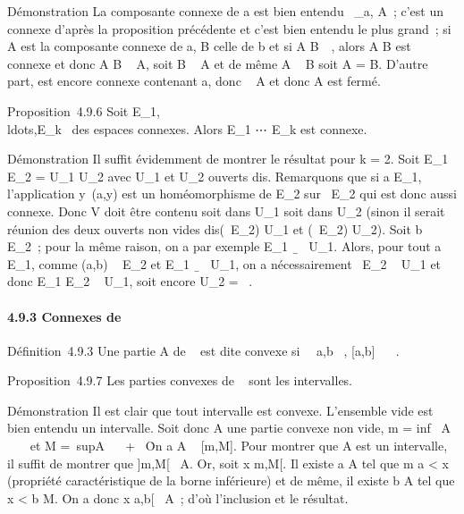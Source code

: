 \documentclass[]{article}
\begin{document}
Démonstration La composante connexe de a est bien entendu
\⋃  ~\_a\inA,
A\textconnexeA~; c'est un connexe d'après la
proposition précédente et c'est bien entendu le plus grand~; si A est la
composante connexe de a, B celle de b et si A \bigcap
B\neq~\varnothing~, alors A \cup B est connexe et donc A \cup B \subset~
A, soit B \subset~ A et de même A \subset~ B soit A = B. D'autre part,
\overlineA est encore connexe contenant a, donc
\overlineA \subset~ A et donc A est fermé.

Proposition~4.9.6 Soit
E\_1,\\ldots,E\_k~
des espaces connexes. Alors E\_1 \times⋯ \times
E\_k est connexe.

Démonstration Il suffit évidemment de montrer le résultat pour k = 2.
Soit E\_1 \times E\_2 = U\_1 \cup U\_2 avec
U\_1 et U\_2 ouverts dis\jmathoints. Remarquons que si a \in
E\_1, l'application y\mapsto~(a,y) est un
homéomorphisme de E\_2 sur \a\
\times E\_2 qui est donc aussi connexe. Donc V doit être contenu soit
dans U\_1 soit dans U\_2 (sinon il serait réunion des
deux ouverts non vides dis\jmathoints (\a\
\times E\_2) \bigcap U\_1 et (\a\
\times E\_2) \bigcap U\_2). Soit b \in E\_2~; pour la même
raison, on a par exemple E\_1
\times\b\ \subset~ U\_1. Alors, pour tout
a \in E\_1, comme (a,b) \in\a\ \times
E\_2 et E\_1 \times\b\ \subset~
U\_1, on a nécessairement \a\
\times E\_2 \subset~ U\_1 et donc E\_1 \times E\_2 \subset~
U\_1, soit encore U\_2 = \varnothing~.

\paragraph{4.9.3 Connexes de ~}

Définition~4.9.3 Une partie A de ~ est dite convexe si
\forall~~a,b \in {}~, {[}a,b{]} \subset~ ~.

Proposition~4.9.7 Les parties convexes de ~ sont les intervalles.

Démonstration Il est clair que tout intervalle est convexe. L'ensemble
vide est bien entendu un intervalle. Soit donc A une partie convexe non
vide, m = inf~ A \in \mathbb{R}~
\cup\-\infty~\ et M =\
supA \in {}~ \cup\ + \infty~\. On a A \subset~
{[}m,M{]}. Pour montrer que A est un intervalle, il suffit de montrer
que {]}m,M{[}\subset~ A. Or, soit x \in{]}m,M{[}. Il existe a \in A tel que m \leq a
\textless{} x (propriété caractéristique de la borne inférieure) et de
même, il existe b \in A tel que x \textless{} b \leq M. On a donc x
\in{]}a,b{[}\subset~ A~; d'où l'inclusion et le résultat.
\end{document}
